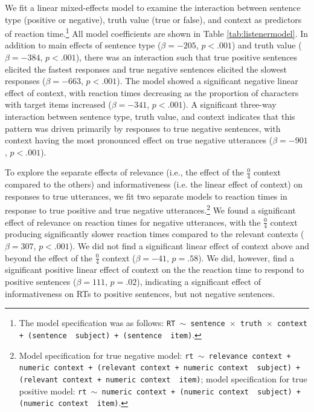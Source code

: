 \documentclass[man, noapacite]{apa2}
\begin{document}
We fit a linear mixed-effects model to examine the interaction between sentence type (positive or negative), truth value (true or false), and context as predictors of reaction time.\footnote{The model specification was as follows: \texttt{RT $\sim$ sentence~$\times$~truth~$\times$~context + (sentence~\textbar~subject) +  (sentence~\textbar~item)}.} All model coefficients are shown in Table \ref{tab:listenermodel}. In addition to main effects of sentence type ($\beta= -205$, $p< .001$) and truth value ($\beta= -384$, $p< .001$), there was an interaction such that true positive sentences elicited the fastest responses and true negative sentences elicited the slowest responses ($\beta= -663$, $p< .001$). The model showed a significant negative linear effect of context, with reaction times decreasing as the proportion of characters with target items increased ($\beta= -341$, $p< .001$). A significant three-way interaction between sentence type, truth value, and context indicates that this pattern was driven primarily by responses to true negative sentences, with context having the most pronounced effect on true negative utterances ($\beta= -901$, $p< .001$).  

To explore the separate effects of relevance (i.e., the effect of the $\frac{0}{4}$ context compared to the others) and informativeness (i.e. the linear effect of context) on responses to true utterances, we fit two separate models to reaction times in response to true positive and true negative utterances.\footnote{Model specification for true negative model: \texttt{rt $\sim$  relevance context + numeric context + (relevant context + numeric context~\textbar~subject) +  (relevant context + numeric context~\textbar~item)}; model specification for true positive model: \texttt{rt $\sim$  numeric context + (numeric context~\textbar~subject) +  (numeric context~\textbar~item)}.} We found a significant effect of relevance on reaction times for negative utterances, with the $\frac{0}{4}$ context producing significantly slower reaction times compared to the relevant contexts ($\beta= 307$, $p< .001$). We did not find a significant linear effect of context above and beyond the effect of the  $\frac{0}{4}$ context ($\beta= -41$, $p = .58$). We did, however, find a significant positive linear effect of context on the the reaction time to respond to positive sentences ($\beta= 111$, $p = .02$), indicating a significant effect of informativeness on RTs to positive sentences, but not negative sentences. 
\end{document}
